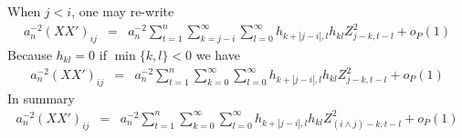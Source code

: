 \documentclass{article}
\begin{document}
When $j < i$, one may re-write
\begin{eqnarray*}
  a_n^{-2}(XX')_{ij} &=& a_n^{-2} \sum_{t=1}^n \sum_{k=j-i}^\infty \sum_{l=0}^\infty
  h_{k+|j-i|,l} h_{kl} Z_{j-k, t-l}^2 + o_P(1)
\end{eqnarray*}
Because $h_{kl} = 0$ if $\min\{k,l\} < 0$ we have
\begin{eqnarray*}
  a_n^{-2}(XX')_{ij} &=& a_n^{-2}\sum_{t=1}^n \sum_{k=0}^\infty \sum_{l=0}^\infty
  h_{k+|j-i|,l} h_{kl} Z_{j-k, t-l}^2 + o_P(1)
\end{eqnarray*}
In summary
\begin{eqnarray*}
  a_n^{-2}(XX')_{ij} &=& a_n^{-2} \sum_{t=1}^n \sum_{k=0}^\infty \sum_{l=0}^\infty
  h_{k+|j-i|,l} h_{kl} Z_{(i \wedge j) -k, t-l}^2 + o_P(1)
\end{eqnarray*}
\end{document}
